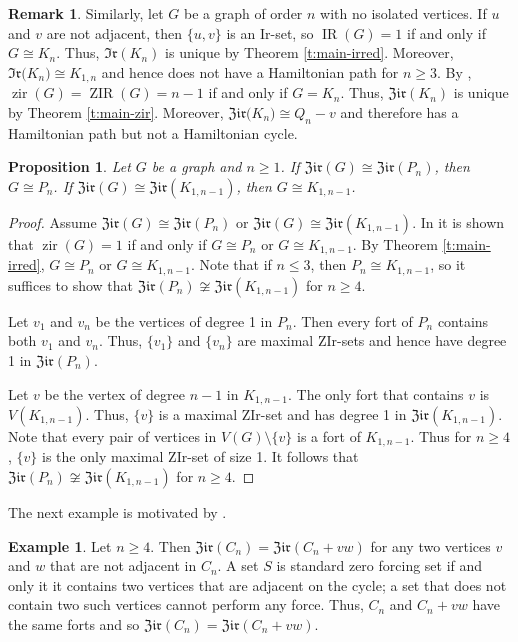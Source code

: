 \documentclass{article}
\numberwithin{figure}{section}
\numberwithin{table}{section}
\numberwithin{equation}{section}
\newtheorem{prop}[thm]{Proposition}
\theoremstyle{definition}
\newtheorem{rem}[thm]{Remark}
\theoremstyle{definition}
\theoremstyle{definition}
\newtheorem{ex}[thm]{Example}
\newcommand{\irtar}{\mathfrak{Ir}}%
\newcommand{\zirtar}{\mathfrak{Zir}}%
\DeclareMathOperator{\IR}{IR}
\DeclareMathOperator{\zir}{zir}
\DeclareMathOperator{\ZIR}{ZIR}
\begin{document}
{\begin{rem}
Similarly, let $G$ be  a graph of order $n$ with no isolated vertices.  If  $u$ and $v$ are not adjacent, then $\{u,v\}$ is an Ir-set, so $\IR(G)=1$ if and only if $G\cong K_n$.  Thus, $\irtar({K_n})$ is unique by   Theorem \ref{t:main-irred}. Moreover, $\irtar({K_n)} \cong K_{1,n}$  and hence does not have a Hamiltonian path for $n\geq 3$.
By \cite[Remark 5.2]{ZIR}, $\zir(G) = \ZIR(G) = n-1$ if and only if $G = {K_n}$. Thus, $\zirtar({K_n})$ is unique by   Theorem \ref{t:main-zir}. Moreover, $\zirtar({K_n)} \cong Q_n-v$  and therefore has a Hamiltonian path but not a Hamiltonian cycle.
\end{rem}


\begin{prop}
Let $G$ be a graph and $n\geq 1$. If $\zirtar(G) \cong \zirtar(P_n)$, then $G\cong P_n$. If $\zirtar(G) \cong \zirtar(K_{1,n-1})$, then $G\cong K_{1,n-1}$.
\end{prop}
\begin{proof} Assume $\zirtar(G) \cong \zirtar(P_n)$ or $\zirtar(G) \cong \zirtar(K_{1,n-1})$.  In \cite{ZIR} it is shown that $\zir(G) = 1$ if and only if $G\cong P_n$ or $G\cong K_{1,n-1}$.
 By  Theorem \ref{t:main-irred}, $G\cong P_n$ or $G\cong K_{1,n-1}$. Note that if $n\leq 3$, then $P_n \cong K_{1,n-1}$, so it suffices to show that $\zirtar(P_n) \not\cong \zirtar(K_{1,n-1})$  for $n\ge 4$. 

Let $v_1$ and $v_n$ be the vertices of degree 1 in $P_n$. Then every fort of $P_n$ contains both $v_1$ and $v_n$. Thus, $\{v_1\}$ and $\{v_n\}$ are maximal ZIr-sets and hence have degree 1 in $\zirtar(P_n)$.

Let $v$ be the vertex of degree $n-1$ in $K_{1,n-1}$. The only fort that contains $v$ is $V(K_{1,n-1})$. Thus, $\{v\}$ is a maximal ZIr-set and has degree 1 in $\zirtar(K_{1,n-1})$. Note that every pair of vertices in $V(G)\setminus \{v\}$ is a fort of $K_{1,n-1}$. Thus  for $n\ge 4$, $\{v\}$ is the only maximal ZIr-set of size 1. It follows that  $\zirtar(P_n) \not\cong \zirtar(K_{1,n-1})$ for $n\ge 4$.
\end{proof}


The next example is motivated by \cite[Example 3.3]{XTARiso}.
\begin{ex}
Let $n\geq 4$. Then $\zirtar(C_n) = \zirtar(C_n + vw)$ for any two vertices $v$ and $w$ that are not adjacent in $C_n$. A set $S$ is standard zero forcing set if and only it it contains two vertices that are adjacent on the cycle; a set that does not contain two such vertices cannot perform any force. %
Thus, $C_n$ and $C_n + vw$ have the same forts and so $\zirtar(C_n) = \zirtar(C_n + vw)$.
\end{ex}





}
\end{document}
